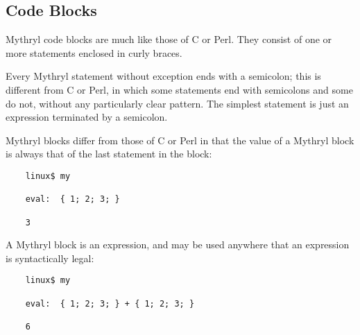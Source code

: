 
\subsection{Code Blocks}
\label{section:ref:code-blocks:code-blocks}

Mythryl code blocks are much like those of C or Perl. 
They consist of one or more statements enclosed in curly 
braces.

Every Mythryl statement without exception ends 
with a semicolon;  this is different from C or Perl, in 
which some statements end with semicolons and some do 
not, without any particularly clear pattern. 
The simplest statement is just an expression terminated 
by a semicolon.

Mythryl blocks differ from those of C or Perl in that 
the value of a Mythryl block is always that of the last 
statement in the block:

\begin{verbatim}
    linux$ my

    eval:  { 1; 2; 3; }

    3
\end{verbatim}

A Mythryl block is an expression, and may be used anywhere 
that an expression is syntactically legal:

\begin{verbatim}
    linux$ my

    eval:  { 1; 2; 3; } + { 1; 2; 3; }

    6
\end{verbatim}

\cutend*




